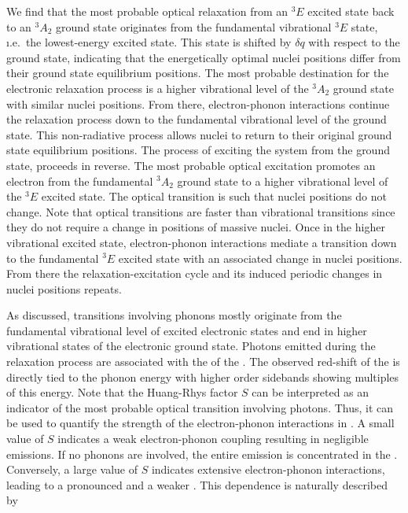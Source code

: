    We find that the most probable optical relaxation from an ${}^{3}E$ excited state back to an ${}^{3}A_{2}$ ground state originates from the fundamental vibrational ${}^{3}E$ state, \i.e.\ the lowest-energy excited state. This state is shifted by $\delta q$ with respect to the ground state, indicating that the energetically optimal nuclei positions differ from their ground state equilibrium positions. The most probable destination for the electronic relaxation process is a higher vibrational level of the ${}^{3}A_{2}$ ground state with similar nuclei positions. From there, electron-phonon interactions continue the relaxation process down to the fundamental vibrational level of the ground state. This non-radiative process allows nuclei to return to their original ground state equilibrium positions. 
   The process of exciting the system from the ground state, proceeds in reverse. The most probable optical excitation promotes an electron from the fundamental ${}^{3}A_{2}$ ground state to a higher vibrational level of the ${}^{3}E$ excited state. The optical transition is such that nuclei positions do not change. Note that optical transitions are faster than vibrational transitions since they do not require a change in positions of massive nuclei. Once in the higher vibrational excited state, electron-phonon interactions mediate a transition down to the fundamental ${}^{3}E$ excited state with an associated change in nuclei positions. From there the relaxation-excitation cycle and its induced periodic changes in nuclei positions repeats.

   As discussed, transitions involving phonons mostly originate from the fundamental vibrational level of excited electronic states and end in higher vibrational states of the electronic ground state. Photons emitted during the relaxation process are associated with the \psb of the \siv.
   The observed red-shift of the \psb is directly tied to the phonon energy with higher order sidebands showing multiples of this energy. Note that the Huang-Rhys factor $S$ can be interpreted as an indicator of the most probable optical transition involving photons. Thus, it can be used to quantify the strength of the electron-phonon interactions in \sivs. A small value of $S$ indicates a weak electron-phonon coupling resulting in negligible \psb emissions. If no phonons are involved, the entire emission is concentrated in the \zpl. Conversely, a large value of $S$ indicates extensive electron-phonon interactions, leading to a pronounced \psb and a weaker \zpl. This dependence is naturally described by

